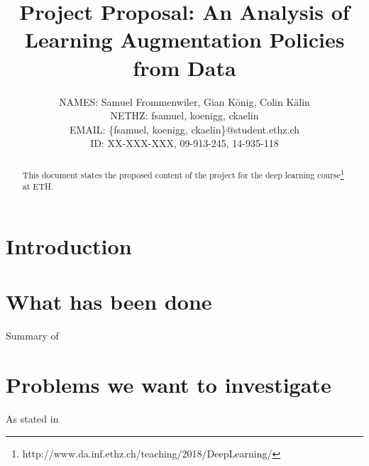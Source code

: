 \documentclass[10pt,twocolumn,letterpaper]{article}
\begin{document}
\title{Project Proposal: An Analysis of Learning Augmentation Policies from Data}

\author{
    	\small{NAMES: Samuel Frommenwiler, Gian K\"onig, Colin K\"alin} \\
   	\small{NETHZ: fsamuel, koenigg, ckaelin}\\
	\small{EMAIL: \{fsamuel, koenigg, ckaelin\}$@$student.ethz.ch}\\
    	\small{ID: XX-XXX-XXX, 09-913-245, 14-935-118}
}

\maketitle

\begin{abstract}
   This document states the proposed content of the project for the deep learning course\footnote{http://www.da.inf.ethz.ch/teaching/2018/DeepLearning/} at ETH.
\end{abstract}

\section{Introduction}

\section{What has been done}

Summary of ~\cite{DBLP:journals/corr/abs-1805-09501}

\section{Problems we want to investigate}
As stated in~\cite{Goodfellow-et-al-2016} 

{\small


}
\end{document}
